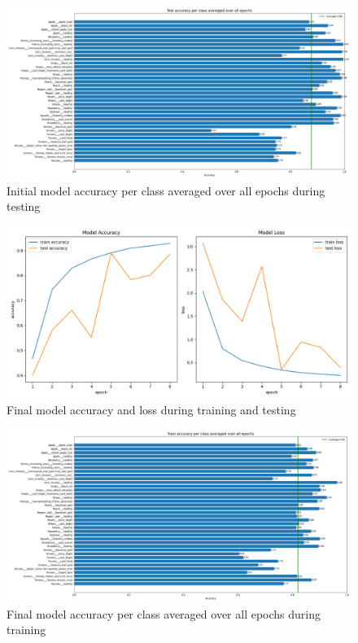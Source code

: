 \documentclass{BachelorBUI}
\begin{document}
        \begin{figure}[h]
            \centering
            \includegraphics[width=\textwidth]{initial_test_accuracy_per_class_2024-11-25_07.55.35.png}
            \caption{\centering Initial model accuracy per class averaged over all epochs during testing}
            \label{fig:initial-test-accuracy-per-class}
        \end{figure}
        \begin{figure}[h]
            \centering
            \includegraphics[width=\textwidth]{final_accuracy_and_loss_2024-11-25_11.16.13.png}
            \caption{\centering Final model accuracy and loss during training and testing}
            \label{fig:final-accuracy-and-loss}
        \end{figure}
        \begin{figure}[h]
            \centering
            \includegraphics[width=\textwidth]{final_train_accuracy_per_class_2024-11-25_11.16.13.png}
            \caption{\centering Final model accuracy per class averaged over all epochs during training}
            \label{fig:final-train-accuracy-per-class}
        \end{figure}
\end{document}
